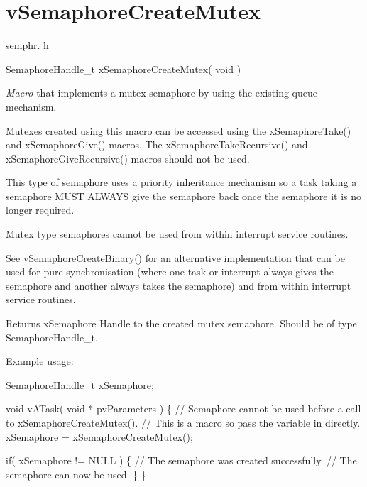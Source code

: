 \hypertarget{group__v_semaphore_create_mutex}{}\section{v\+Semaphore\+Create\+Mutex}
\label{group__v_semaphore_create_mutex}
semphr. h 
\begin{DoxyPre}SemaphoreHandle\_t xSemaphoreCreateMutex( void )\end{DoxyPre}


{\itshape Macro} that implements a mutex semaphore by using the existing queue mechanism.

Mutexes created using this macro can be accessed using the x\+Semaphore\+Take() and x\+Semaphore\+Give() macros. The x\+Semaphore\+Take\+Recursive() and x\+Semaphore\+Give\+Recursive() macros should not be used.

This type of semaphore uses a priority inheritance mechanism so a task \textquotesingle{}taking\textquotesingle{} a semaphore M\+U\+S\+T A\+L\+W\+A\+Y\+S \textquotesingle{}give\textquotesingle{} the semaphore back once the semaphore it is no longer required.

Mutex type semaphores cannot be used from within interrupt service routines.

See v\+Semaphore\+Create\+Binary() for an alternative implementation that can be used for pure synchronisation (where one task or interrupt always \textquotesingle{}gives\textquotesingle{} the semaphore and another always \textquotesingle{}takes\textquotesingle{} the semaphore) and from within interrupt service routines.

\begin{DoxyReturn}{Returns}
x\+Semaphore Handle to the created mutex semaphore. Should be of type Semaphore\+Handle\+\_\+t.
\end{DoxyReturn}
Example usage\+: 
\begin{DoxyPre}
SemaphoreHandle\_t xSemaphore;\end{DoxyPre}



\begin{DoxyPre}void vATask( void * pvParameters )
\{
   // Semaphore cannot be used before a call to xSemaphoreCreateMutex().
   // This is a macro so pass the variable in directly.
   xSemaphore = xSemaphoreCreateMutex();\end{DoxyPre}



\begin{DoxyPre}   if( xSemaphore != NULL )
   \{
       // The semaphore was created successfully.
       // The semaphore can now be used.
   \}
\}
\end{DoxyPre}


